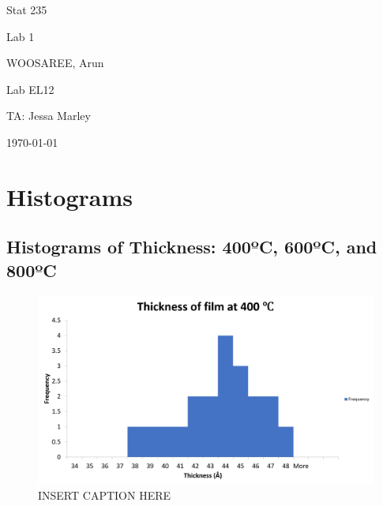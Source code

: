 \documentclass[letterpaper]{article}
\begin{document}
\begin{titlepage}
 \begin{center}
  \vspace*{1cm}
  \Huge
  Stat 235
  \vspace{1cm}
  
  Lab 1
  \vspace{1cm}
  
  WOOSAREE, Arun
  \vspace{1cm}
  
  \Huge
  Lab EL12
  \vspace{1cm}
  
  TA: Jessa Marley
  \vspace{1cm}
  
  \today
  \vfill
 \end{center}
\end{titlepage}

\section{Histograms}

\subsection{Histograms of Thickness: 400ºC, 600ºC, and 800ºC}

\begin{figure}[H]
 \centering
 \includegraphics[width=\textwidth]{thicc400.png}
 \caption{INSERT CAPTION HERE}
 \label{thicc400}
\end{figure}
\end{document}
